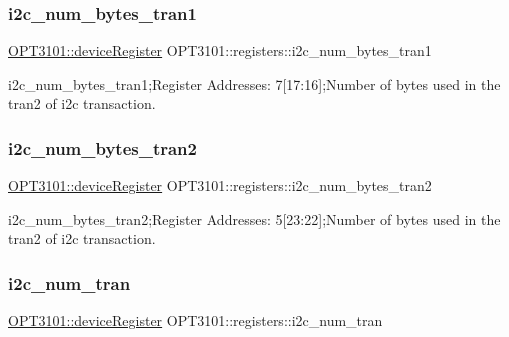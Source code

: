 \subsubsection{\texorpdfstring{i2c\+\_\+num\+\_\+bytes\+\_\+tran1}{i2c\_num\_bytes\_tran1}}
{\footnotesize\ttfamily \mbox{\hyperlink{class_o_p_t3101_1_1device_register}{O\+P\+T3101\+::device\+Register}} O\+P\+T3101\+::registers\+::i2c\+\_\+num\+\_\+bytes\+\_\+tran1}



i2c\+\_\+num\+\_\+bytes\+\_\+tran1;Register Addresses\+: 7\mbox{[}17\+:16\mbox{]};Number of bytes used in the tran2 of i2c transaction. 

\mbox{\label{class_o_p_t3101_1_1registers_a664868970effaa22e41d7c6e346f8794}} 
\subsubsection{\texorpdfstring{i2c\+\_\+num\+\_\+bytes\+\_\+tran2}{i2c\_num\_bytes\_tran2}}
{\footnotesize\ttfamily \mbox{\hyperlink{class_o_p_t3101_1_1device_register}{O\+P\+T3101\+::device\+Register}} O\+P\+T3101\+::registers\+::i2c\+\_\+num\+\_\+bytes\+\_\+tran2}



i2c\+\_\+num\+\_\+bytes\+\_\+tran2;Register Addresses\+: 5\mbox{[}23\+:22\mbox{]};Number of bytes used in the tran2 of i2c transaction. 

\mbox{\label{class_o_p_t3101_1_1registers_a0c38b1f0e52b91fda5deaa74d588d4ee}} 
\subsubsection{\texorpdfstring{i2c\+\_\+num\+\_\+tran}{i2c\_num\_tran}}
{\footnotesize\ttfamily \mbox{\hyperlink{class_o_p_t3101_1_1device_register}{O\+P\+T3101\+::device\+Register}} O\+P\+T3101\+::registers\+::i2c\+\_\+num\+\_\+tran}



